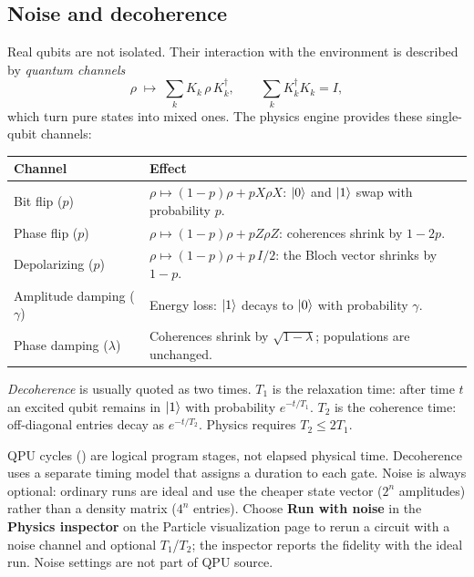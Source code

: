 \subsection{Noise and decoherence}

Real qubits are not isolated. Their interaction with the environment is
described by \emph{quantum channels}
\[
\rho\;\longmapsto\;\sum_k K_k\,\rho\,K_k^\dagger,
\qquad \sum_k K_k^\dagger K_k=I,
\]
which turn pure states into mixed ones. The physics engine provides these
single-qubit channels:
\begin{center}
\begin{tabularx}{\textwidth}{l X}
\toprule
Channel & Effect\\
\midrule
Bit flip ($p$) & $\rho\mapsto(1-p)\rho+pX\rho X$: $\lvert 0\rangle$ and $\lvert 1\rangle$ swap with probability $p$.\\
Phase flip ($p$) & $\rho\mapsto(1-p)\rho+pZ\rho Z$: coherences shrink by $1-2p$.\\
Depolarizing ($p$) & $\rho\mapsto(1-p)\rho+p\,I/2$: the Bloch vector shrinks by $1-p$.\\
Amplitude damping ($\gamma$) & Energy loss: $\lvert 1\rangle$ decays to $\lvert 0\rangle$ with probability $\gamma$.\\
Phase damping ($\lambda$) & Coherences shrink by $\sqrt{1-\lambda}$; populations are unchanged.\\
\bottomrule
\end{tabularx}
\end{center}

\emph{Decoherence} is usually quoted as two times. $T_1$ is the relaxation
time: after time $t$ an excited qubit remains in $\lvert 1\rangle$ with probability
$e^{-t/T_1}$. $T_2$ is the coherence time: off-diagonal entries decay as
$e^{-t/T_2}$. Physics requires $T_2\le2T_1$.

\begin{cautionbox}
QPU cycles () are logical program stages, not elapsed
physical time. Decoherence uses a separate timing model that assigns a
duration to each gate. Noise is always optional: ordinary runs are ideal and
use the cheaper state vector ($2^n$ amplitudes) rather than a density matrix
($4^n$ entries). Choose \textbf{Run with noise} in the \textbf{Physics
inspector} on the Particle visualization page to rerun a circuit with a noise
channel and optional $T_1$/$T_2$; the inspector reports the fidelity with the
ideal run. Noise settings are not part of QPU source.
\end{cautionbox}

